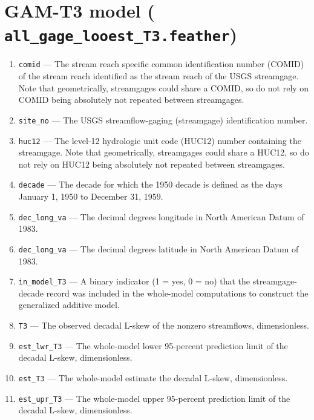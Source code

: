 \documentclass[1p, authoryear, 11pt, times, preprint]{elsarticle}
\newcommand{\code}[1]{{\color{black}%
                       \mbox{\lstinline[basicstyle={\small\ttfamily},
                                        keywordstyle=\scriptsize\ttfamily]|#1|}}}
\begin{document}



\section{GAM-T3 model (\code{all_gage_looest_T3.feather})}
\begin{enumerate}
\footnotesize
\RaggedRight
\item \code{comid} --- The stream reach specific common identification number (COMID) of the stream reach identified as the stream reach of the USGS streamgage. Note that geometrically, streamgages could share a COMID, so do not rely on COMID being absolutely not repeated between streamgages.
\item \code{site_no} --- The USGS streamflow-gaging (streamgage) identification number.
\item \code{huc12} --- The level-12 hydrologic unit code (HUC12) number containing the streamgage. Note that geometrically, streamgages could share a HUC12, so do not rely on HUC12 being absolutely not repeated between streamgages.
\item \code{decade} --- The decade for which the 1950 decade is defined as the days January 1, 1950 to December 31, 1959.
\item \code{dec_long_va} --- The decimal degrees longitude in North American Datum of 1983.
\item \code{dec_long_va} --- The decimal degrees latitude in North American Datum of 1983.
\item \code{in_model_T3} --- A binary indicator (1 = yes, 0 = no) that the streamgage-decade record was included in the whole-model computations to construct the generalized additive model.
\item \code{T3} --- The observed decadal L-skew of the nonzero streamflows, dimensionless.
\item \code{est_lwr_T3} --- The whole-model lower 95-percent prediction limit of the decadal L-skew, dimensionless.
\item \code{est_T3} --- The whole-model estimate the decadal L-skew, dimensionless.
\item \code{est_upr_T3} --- The whole-model upper 95-percent prediction limit of the decadal L-skew, dimensionless.

\end{enumerate}
\end{document}
